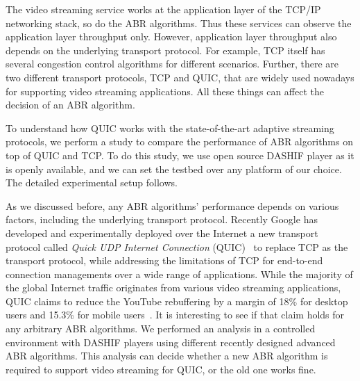 The video streaming service works at the application layer of the TCP/IP networking stack, so do the ABR algorithms. Thus these services can observe the application layer throughput only. However, application layer throughput also depends on the underlying transport protocol. For example, TCP itself has several congestion control algorithms for different scenarios. Further, there are two different transport protocols, TCP and QUIC, that are widely used nowadays for supporting video streaming applications. All these things can affect the decision of an ABR algorithm. 

To understand how QUIC works with the state-of-the-art adaptive streaming protocols, we perform a study to compare the performance of ABR algorithms on top of QUIC and TCP. To do this study, we use open source DASHIF player as it is openly available, and we can set the testbed over any platform of our choice. The detailed experimental setup follows. 

As we discussed before, any ABR algorithms' performance depends on various factors, including the underlying transport protocol. 
Recently Google has developed and experimentally deployed over the Internet a new transport protocol called \textit{Quick UDP Internet Connection} (QUIC)~\cite{langley2017quic} to replace TCP as the transport protocol, while addressing the limitations of TCP for end-to-end connection managements over a wide range of applications. While the majority of the global Internet traffic originates from various video streaming applications, QUIC claims to reduce the YouTube rebuffering by a margin of 18\% for desktop users and 15.3\% for mobile users~\cite{langley2017quic}.  It is interesting to see if that claim holds for any arbitrary ABR algorithms. We performed an analysis in a controlled environment with DASHIF players using different recently designed advanced ABR algorithms. This analysis can decide whether a new ABR algorithm is required to support video streaming for QUIC, or the old one works fine.

